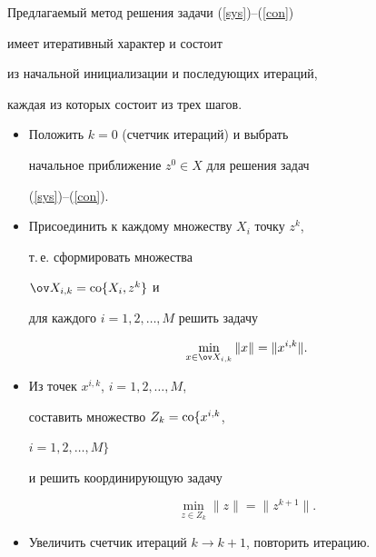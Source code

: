 Предлагаемый метод решения задачи (\ref{sys})--(\ref{con})


имеет итеративный характер и состоит


из начальной инициализации и последующих итераций, 


каждая из которых состоит из трех шагов.


\begin{itemize}


\begin{itemize}


\item[{\it Начало.}]


Положить $k=0$ (счетчик итераций) и выбрать


начальное приближение $z^0 \in X $ для решения задач


(\ref{sys})--(\ref{con}).


\item[{\it Шаг 1.}]


Присоединить к каждому множеству $X_i$ точку $z^k$,


т.\,е. сформировать множества


$\ov X_{i,k} = \co\lbrace X_i, z^k \rbrace$ и


для каждого $i=1,2,\dotsc,M$ решить задачу


\begin{equation}\label{iprob}


\min_{x \in \ov X_{i,k}} \|x\| = \| x^{i,k}\|.


\end{equation}


\item[{\it Шаг 2.}]


Из точек $x^{i,k}$, $i = 1, 2, \dotsc, M$,


составить множество $Z_k = \operatorname{co} \lbrace x^{i,k}$, 


$i = 1, 2, \dotsc, M \rbrace $


и решить координирующую задачу


\begin{equation}\label{prob}


\min_{z \in Z_k } \|z\| = \| z^{k+1}\|.


\end{equation}


\item[{\it Шаг 3.}]


Увеличить счетчик итераций $ k \to k+1 $, повторить итерацию.


\end{itemize}


\end{itemize}





